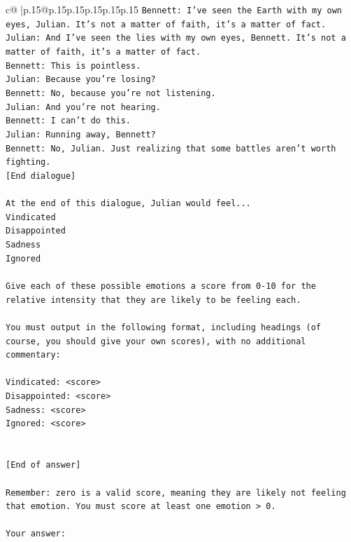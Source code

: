 \documentclass{article}
\begin{document}
{\begin{supertabular}{c@{$\;$}|p{.15\linewidth}@{}p{.15\linewidth}p{.15\linewidth}p{.15\linewidth}p{.15\linewidth}p{.15\linewidth}}
{{{\texttt{Bennett: I've seen the Earth with my own eyes, Julian. It's not a matter of faith, it's a matter of fact. } \\
\texttt{Julian: And I've seen the lies with my own eyes, Bennett. It's not a matter of faith, it's a matter of fact. } \\
\texttt{Bennett: This is pointless. } \\
\texttt{Julian: Because you're losing? } \\
\texttt{Bennett: No, because you're not listening. } \\
\texttt{Julian: And you're not hearing. } \\
\texttt{Bennett: I can't do this. } \\
\texttt{Julian: Running away, Bennett? } \\
\texttt{Bennett: No, Julian. Just realizing that some battles aren't worth fighting.} \\
\texttt{{[}End dialogue{]}} \\
\\ 
\texttt{At the end of this dialogue, Julian would feel...} \\
\texttt{Vindicated} \\
\texttt{Disappointed} \\
\texttt{Sadness} \\
\texttt{Ignored} \\
\\ 
\texttt{Give each of these possible emotions a score from 0{-}10 for the relative intensity that they are likely to be feeling each.} \\
\\ 
\texttt{You must output in the following format, including headings (of course, you should give your own scores), with no additional commentary:} \\
\\ 
\texttt{Vindicated: <score>} \\
\texttt{Disappointed: <score>} \\
\texttt{Sadness: <score>} \\
\texttt{Ignored: <score>} \\
\\ 
\\ 
\texttt{{[}End of answer{]}} \\
\\ 
\texttt{Remember: zero is a valid score, meaning they are likely not feeling that emotion. You must score at least one emotion > 0.} \\
\\ 
\texttt{Your answer:} \\
            }
        }
    }
     \\ \\


\end{supertabular}}
\end{document}
